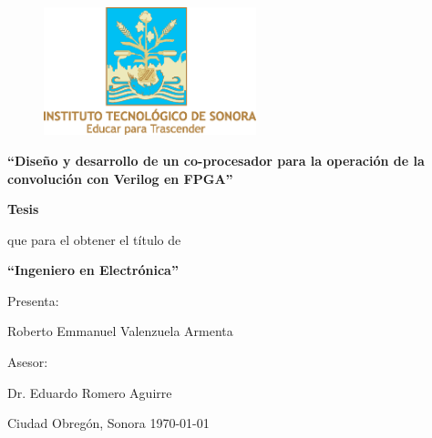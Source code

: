\thispagestyle{empty}
\begin{figure}[!t]
\centering
\includegraphics[width=0.55\textwidth, height=0.25\textheight]{./figs/logoclr}
\end{figure}

\begin{center}

{\bf \LARGE ``Diseño y desarrollo de un co-procesador para la operación de la convolución con Verilog en FPGA''}

\vspace*{0.75cm}

{\bf \Large Tesis }

\vspace*{0.65cm}

{\Large que para el obtener el título de}

\vspace{0.65cm}

{\bf \Large ``Ingeniero en Electrónica''}

\vspace{0.75cm}

\begin{framed}

{\large Presenta:}

\vspace{0.3cm}

{\large Roberto Emmanuel Valenzuela Armenta}

\vspace{0.3cm}

{\large Asesor:}

\vspace{0.3cm}

{\large Dr. Eduardo Romero Aguirre}

\end{framed}

\vfill

\begin{shaded*}
{\large {\color{white}Ciudad Obregón, Sonora \hfill \today}}
\end{shaded*}

\end{center}

\pagebreak